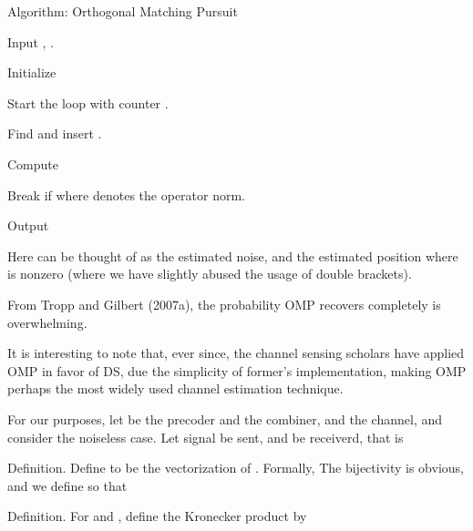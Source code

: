 \Result
{Algorithm: Orthogonal Matching Pursuit}
{
\startitemize[n]
\item Input , .
\item Initialize
\item Start the loop with counter .
\item Find
and insert .
\item Compute
\item Break if
where  denotes the operator norm.
\item Output 
\stopitemize
}
Here  can be thought of as the estimated noise, and  the estimated position where  is nonzero (where we have slightly abused the usage of double brackets).

From Tropp and Gilbert (2007a), the probability OMP recovers  completely is overwhelming.

It is interesting to note that, ever since, the channel sensing scholars have applied OMP in favor of DS, due the simplicity of former's implementation, making OMP perhaps the most widely used channel estimation technique.

For our purposes, let  be the precoder and  the combiner, and  the channel, and consider the noiseless case.
Let signal  be sent, and  be receiverd, that is


\Result
{Definition.}
{
Define  to be the vectorization of .
Formally,
The bijectivity is obvious, and we define  so that
}

\Result
{Definition.}
{
For  and , define the Kronecker product  by
}

